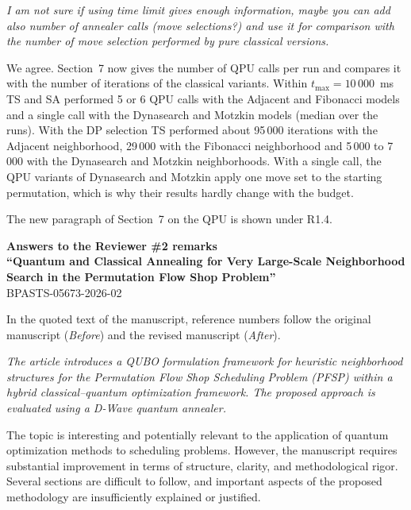 \documentclass[12pt]{article}
\newenvironment{rc}[1]{\par\medskip\noindent\itshape\renewcommand{\emph}[1]{\textbf{##1}}\ignorespaces}{\par}
\newenvironment{lead}{\par\medskip\noindent\itshape\renewcommand{\emph}[1]{\textbf{##1}}\ignorespaces}{\par}
\newcommand{\answer}[1]{\par\smallskip\noindent #1\par}
\begin{document}
\begin{rc}{R1.6 --- Number of annealer calls}
I am not sure if using time limit gives enough information, maybe you can add also number of annealer calls (move selections?) and use it for comparison with the number of move selection performed by pure classical versions.
\end{rc}
\answer{We agree. Section~7 now gives the number of QPU calls per run and compares it with the number of iterations of the classical variants. Within $t_{\max}=10\,000$~ms TS and SA performed 5 or 6 QPU calls with the Adjacent and Fibonacci models and a single call with the Dynasearch and Motzkin models (median over the runs). With the DP selection TS performed about 95\,000 iterations with the Adjacent neighborhood, 29\,000 with the Fibonacci neighborhood and 5\,000 to 7\,000 with the Dynasearch and Motzkin neighborhoods. With a single call, the QPU variants of Dynasearch and Motzkin apply one move set to the starting permutation, which is why their results hardly change with the budget.}
The new paragraph of Section~7 on the QPU is shown under R1.4.

\newpage

\newpage

\begin{center}
{\bf Answers to the Reviewer \#2 remarks\\[2mm]
``Quantum and Classical Annealing for Very Large-Scale Neighborhood Search in the Permutation Flow Shop Problem''}\\
BPASTS-05673-2026-02\\[5mm]
\end{center}

In the quoted text of the manuscript, reference numbers follow the original manuscript (\textit{Before}) and the revised manuscript (\textit{After}).

\begin{lead}
The article introduces a QUBO formulation framework for heuristic neighborhood structures for the Permutation Flow Shop Scheduling Problem (PFSP) within a hybrid classical--quantum optimization framework. The proposed approach is evaluated using a D-Wave quantum annealer.

The topic is interesting and potentially relevant to the application of quantum optimization methods to scheduling problems. However, the manuscript requires substantial improvement in terms of structure, clarity, and methodological rigor. Several sections are difficult to follow, and important aspects of the proposed methodology are insufficiently explained or justified.
\end{lead}
\end{document}
